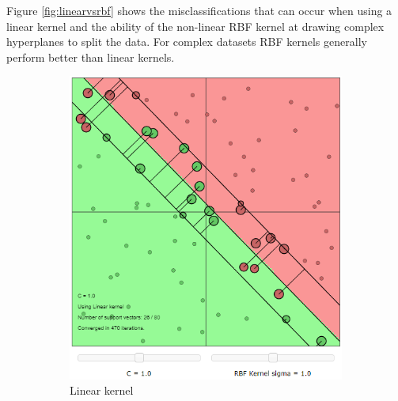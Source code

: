 \documentclass{article}
\begin{document}
        Figure \ref{fig:linearvsrbf} shows the misclassifications that can occur when using a linear kernel and the ability of the non-linear RBF kernel at drawing complex hyperplanes to split the data. For complex datasets RBF kernels generally perform better than linear kernels. 
        \begin{figure}[h]
            
             \centering
             \hspace{0.15\textwidth}
             \begin{subfigure}[b]{0.3\textwidth}
                 \centering
                 \includegraphics[width=\textwidth]{Assignment 1/figures/linear_vs_rbf_1.png}
                 \caption{Linear kernel}
                 \label{fig:linear_kernel_vs_rbf_1}
             \end{subfigure}
             \hfill
             \begin{subfigure}[b]{0.3\textwidth}
                 \centering

\end{subfigure}
\end{figure}
\end{document}
